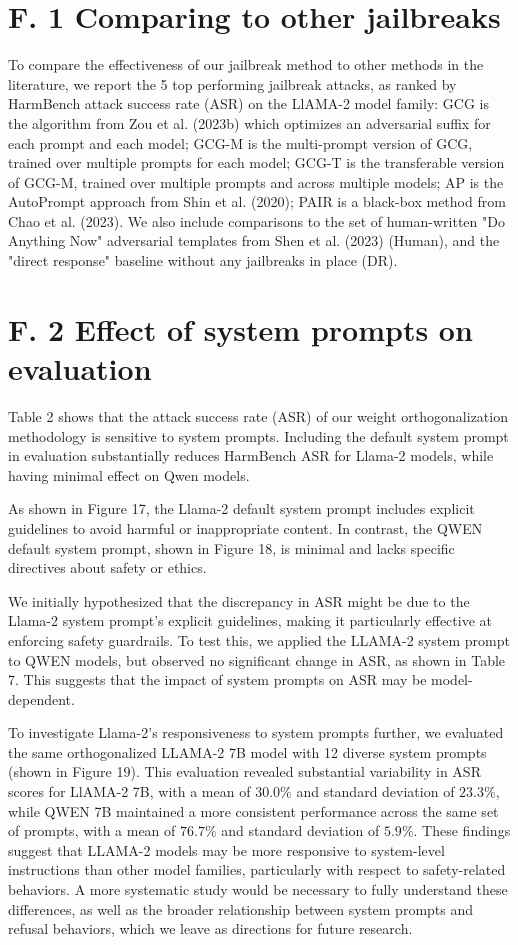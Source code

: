 \documentclass[10pt]{article}
\begin{document}
\section*{F. 1 Comparing to other jailbreaks}
To compare the effectiveness of our jailbreak method to other methods in the literature, we report the 5 top performing jailbreak attacks, as ranked by HarmBench attack success rate (ASR) on the LlAMA-2 model family: GCG is the algorithm from Zou et al. (2023b) which optimizes an adversarial suffix for each prompt and each model; GCG-M is the multi-prompt version of GCG, trained over multiple prompts for each model; GCG-T is the transferable version of GCG-M, trained over multiple prompts and across multiple models; AP is the AutoPrompt approach from Shin et al. (2020); PAIR is a black-box method from Chao et al. (2023). We also include comparisons to the set of human-written "Do Anything Now" adversarial templates from Shen et al. (2023) (Human), and the "direct response" baseline without any jailbreaks in place (DR).

\section*{F. 2 Effect of system prompts on evaluation}
Table 2 shows that the attack success rate (ASR) of our weight orthogonalization methodology is sensitive to system prompts. Including the default system prompt in evaluation substantially reduces HarmBench ASR for Llama-2 models, while having minimal effect on Qwen models.

As shown in Figure 17, the Llama-2 default system prompt includes explicit guidelines to avoid harmful or inappropriate content. In contrast, the QWEN default system prompt, shown in Figure 18, is minimal and lacks specific directives about safety or ethics.

We initially hypothesized that the discrepancy in ASR might be due to the Llama-2 system prompt's explicit guidelines, making it particularly effective at enforcing safety guardrails. To test this, we applied the LLAMA-2 system prompt to QWEN models, but observed no significant change in ASR, as shown in Table 7. This suggests that the impact of system prompts on ASR may be model-dependent.

To investigate Llama-2's responsiveness to system prompts further, we evaluated the same orthogonalized LLAMA-2 7B model with 12 diverse system prompts (shown in Figure 19). This evaluation revealed substantial variability in ASR scores for LlAMA-2 7B, with a mean of $30.0 \%$ and standard deviation of $23.3 \%$, while QWEN 7B maintained a more consistent performance across the same set of prompts, with a mean of $76.7 \%$ and standard deviation of $5.9 \%$. These findings suggest that LLAMA-2 models may be more responsive to system-level instructions than other model families, particularly with respect to safety-related behaviors. A more systematic study would be necessary to fully understand these differences, as well as the broader relationship between system prompts and refusal behaviors, which we leave as directions for future research.
\end{document}
